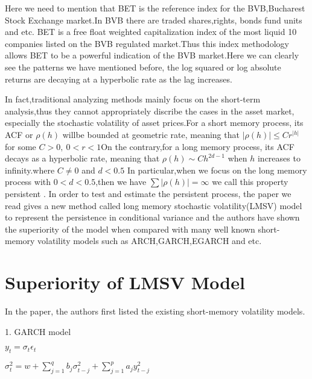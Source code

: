 \documentclass[10pt,a4paper]{article}
\begin{document}
Here we need to mention that BET is the reference index for the BVB,Bucharest Stock Exchange market.In BVB  there are traded shares,rights, bonds fund units and etc. BET is a free float weighted capitalization index of the most liquid 10 companies listed on the BVB regulated market.Thus this index methodology allows BET to be a powerful indication of the BVB market.Here we can clearly see the patterns we have mentioned before, the log squared or log absolute returns are decaying at a hyperbolic rate as the lag increases.

 In fact,traditional analyzing methods mainly focus on the short-term analysis,thus they cannot appropriately discribe the cases in the asset market, especially  the stochastic volatility  of asset prices.For a short memory process, its ACF or $\rho(h)$ willbe bounded at geometric rate, meaning that $|\rho(h)|\leq C r^{|h|}$ for some $C>0,\  0<r<1 $On the contrary,for a long memory process, its ACF decays as a hyperbolic rate, meaning that $\rho(h)\sim Ch^{2d-1}$ when $h$ increases to infinity.where $C\neq 0$ and $d<0.5$ In particular,when we focus on the long memory process with $0<d<0.5$,then we have $\sum |\rho(h)|=\infty$ we call this property persistent .
In order to test and estimate the persistent process, the paper we read gives a new method called long memory stochastic volatility(LMSV) model to represent the persistence in conditional variance and the authors have shown the superiority of the model when compared with many well known short-memory volatility models such as ARCH,GARCH,EGARCH and etc.




 
\section{Superiority of LMSV Model}

In the paper, the authors first listed the existing short-memory volatility models.

\vspace{0.5cm}

1. GARCH model 

\begin{center}$\displaystyle y_t=\sigma_t\epsilon_t$\end{center}

\begin{center} $\displaystyle \sigma_t^2=w+\sum_{j=1}^{q}b_j\sigma^2_{t-j}+\sum_{j=1}^{p}a_jy^2_{t-j} $ \end{center}
\end{document}
